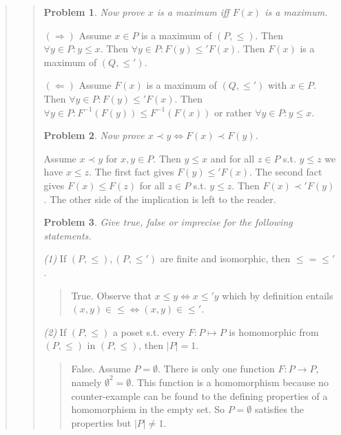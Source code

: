 \documentclass[a4paper, 12pt]{article}
\newtheorem{problem}{Problem}
\newtheorem{problem}{Problem}
\begin{document}
\begin{quote}
\begin{quote}
\begin{problem}
    Now prove $x$ is a maximum iff $F(x)$ is a maximum.
\end{problem}

$(\Rightarrow)$ Assume $x \in P$ is a maximum of $(P, \leq) $. Then $\forall y
\in P : y \leq x$. Then $\forall y \in P: F(y) \leq' F(x)$. Then $F(x)$ is a
maximum of $(Q, \leq') $.

$(\Leftarrow)$ Assume $F(x)$ is a maximum of $(Q, \leq') $ with $x \in P$. Then
$\forall y \in P : F(y) \leq' F(x)$. Then $\forall y \in P : F^{-1} \left( F(y)
\right) \leq F^{-1} \left( F(x) \right) $ or rather $\forall y \in  P : y \leq
x$.

\begin{problem}
    Now prove $x \prec y \iff F(x) \prec F(y)$.
\end{problem}

Assume $x \prec y$ for $x, y \in P$. Then $y \leq x$ and for all $z \in P$ s.t.
$y \leq z$ we have $x \leq z$. The first fact gives $F(y) \leq' F(x)$. The
second fact gives $F(x) \leq F(z)$ for all $z \in P$ s.t. $y \leq z$. Then $F(x)
\prec' F(y)$ . The other side of the implication is left to the reader.

\begin{problem}
    Give true, false or imprecise for the following statements.
\end{problem}

\textit{(1)} If $(P, \leq) , (P, \leq') $ are finite and isomorphic, then $\leq
= \leq'$.

\begin{quote}
    True. Observe that $x \leq y \iff x \leq' y$ which by definition entails
    $(x, y) \in  \leq \iff (x, y) \in  \leq'$.
\end{quote}

\textit{(2)} If $(P, \leq) $ a poset s.t. every $F : P \mapsto P$ is
homomorphic from $(P, \leq) $ in $(P, \leq) $, then $|P| = 1$.

\begin{quote}

    False. Assume $P = \emptyset$. There is only one function $F : P \to P$,
    namely $\emptyset^2 = \emptyset$. This function is a homomorphism because no
    counter-example can be found to the defining properties of a homomorphism in
    the empty set. So $P = \emptyset$ satisfies the properties but $|P| \neq 1$.
\end{quote}

\end{quote}
\normalsize



\end{quote}
\end{document}
